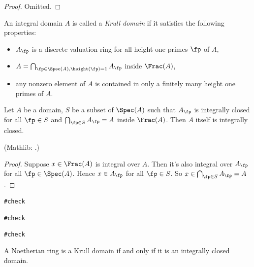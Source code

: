 \begin{proof}
\leanok
Omitted.
\end{proof}

\begin{definition}
\label{krull-domain-defn}
\leanok
An integral domain $A$ is called a \emph{Krull domain}
if it satisfies the following properties:
\begin{itemize}
\item
$A_\fp$ is a discrete valuation ring for all height one primes $\fp$ of $A$,
\item
$A=\bigcap_{\fp\in\Spec(A),\height(\fp)=1}A_\fp$ inside $\Frac(A)$,
\item
any nonzero element of $A$ is contained in only a finitely many height one primes of $A$.
\end{itemize}
\end{definition}


\begin{lem}
\label{integrally-closed-is-local-prop}
\leanok
Let $A$ be a domain, $S$ be a subset of $\Spec(A)$
such that $A_\fp$ is integrally closed for all $\fp\in S$
and $\bigcap_{\fp\in S}A_\fp=A$ inside $\Frac(A)$.
Then $A$ itself is integrally closed.

(Mathlib: .)
\end{lem}

\begin{proof}
\leanok
Suppose $x\in\Frac(A)$ is integral over $A$. Then it's also integral over $A_\fp$
for all $\fp\in\Spec(A)$. Hence $x\in A_\fp$ for all $\fp\in S$.
So $x\in\bigcap_{\fp\in S}A_\fp=A$.
\end{proof}

\noindent\verb|#check |

\noindent\verb|#check |

\noindent\verb|#check |

\begin{prop}
\label{noeth-ring-is-krull-domain-iff}
\leanok
{}
A Noetherian ring is a Krull domain if and only if it is an integrally closed domain.
\end{prop}

